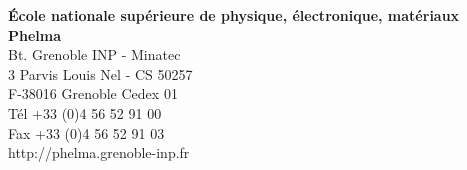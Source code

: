 \begin{titlepage}
\begin{minipage}[b]{0.5\textwidth}

        \textbf{École nationale supérieure de physique, électronique, matériaux} \\[0.2em]
        \textbf{Phelma} \\[0.5em]
        Bt. Grenoble INP - Minatec \\
        3 Parvis Louis Nel - CS 50257 \\
        F-38016 Grenoble Cedex 01 \\[0.5em]
        Tél +33 (0)4 56 52 91 00 \\
        Fax +33 (0)4 56 52 91 03 \\[0.5em]
        http://phelma.grenoble-inp.fr
    \end{minipage}

\end{titlepage}
